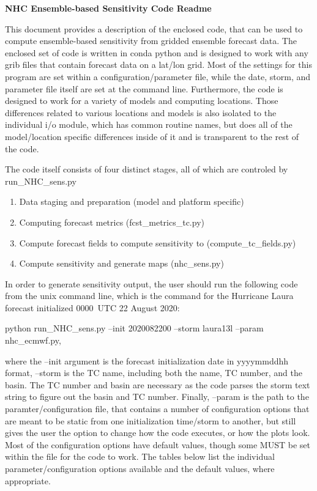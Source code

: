 \documentclass[psfig,12pt]{article}
\begin{document}
\pagestyle{empty}

\centering
{\Large\bf NHC Ensemble-based Sensitivity Code Readme}
\flushleft
\vspace{0.3in}

This document provides a description of the enclosed code, that can be used to compute ensemble-based
sensitivity from gridded ensemble forecast data.  The enclosed set of code is written in conda python
and is designed to work with any grib files that contain forecast data on a lat/lon grid.  Most of the
settings for this program are set within a configuration/parameter file, while the date, storm, and
parameter file itself are set at the command line.  Furthermore,
the code is designed to work for a variety of models and computing locations.  Those differences related
to various locations and models is also isolated to the individual i/o module, which has common routine
names, but does all of the model/location specific differences inside of it and is transparent to 
the rest of the code.

The code itself consists of four distinct stages, all of which are controled by run\_NHC\_sens.py

\begin{enumerate}
\item Data staging and preparation (model and platform specific)
\item Computing forecast metrics (fcst\_metrics\_tc.py)
\item Compute forecast fields to compute sensitivity to (compute\_tc\_fields.py)
\item Compute sensitivity and generate maps (nhc\_sens.py)
\end{enumerate}

In order to generate sensitivity output, the user should run the following code from the unix 
command line, which is the command for the Hurricane Laura forecast initialized 0000~UTC 22 August 2020:

\vspace{0.1in}
python run\_NHC\_sens.py --init 2020082200 --storm laura13l --param nhc\_ecmwf.py, 
\vspace{0.1in}

where the --init argument is the forecast initialization date in yyyymmddhh format, --storm is the 
TC name, including both the name, TC number, and the basin.  The TC number and basin are necessary 
as the code parses the storm text string to figure out the basin and TC number.  Finally, --param is
the path to the paramter/configuration file, that contains a number of configuration options that are
meant to be static from one initialization time/storm to another, but still gives the user the option
to change how the code executes, or how the plots look.  Most of the configuration options have 
default values, though some MUST be set within the file for the code to work.  The tables below list 
the individual parameter/configuration options available and the default values, where appropriate.
\end{document}
